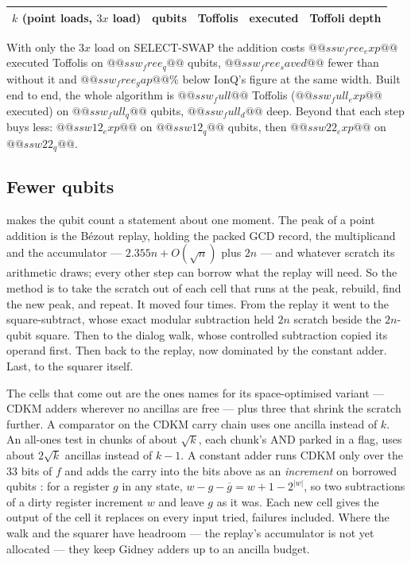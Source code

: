 \begin{center}\small
\begin{tabular}{lrrrr}
\toprule
$k$ (point loads, $3x$ load) & qubits & Toffolis & executed & Toffoli depth\\
\midrule
\bottomrule
\end{tabular}
\end{center}

With only the $3x$ load on SELECT-SWAP the addition costs $@@ssw_free_exp@@$ executed Toffolis on
$@@ssw_free_q@@$ qubits, $@@ssw_free_saved@@$ fewer than without it and $@@ssw_free_gap@@\%$ below IonQ's
figure at the same width. Built end to end, the whole algorithm is $@@ssw_full@@$ Toffolis
($@@ssw_full_exp@@$ executed) on $@@ssw_full_q@@$ qubits, $@@ssw_full_d@@$ deep. Beyond that each
step buys less: $@@ssw12_exp@@$ on $@@ssw12_q@@$ qubits, then $@@ssw22_exp@@$ on $@@ssw22_q@@$.

\subsection{Fewer qubits}\label{ec:sec:fewq}

\cite{ec:schrott26} makes the qubit count a statement about one moment. The peak of a point
addition is the B\'ezout replay, holding the packed GCD record, the multiplicand and the
accumulator --- $2.355n+O(\sqrt n)$ plus $2n$ --- and whatever scratch its arithmetic draws; every
other step can borrow what the replay will need. So the method is to take the scratch out of each
cell that runs at the peak, rebuild, find the new peak, and repeat. It moved four times. From the
replay it went to the square-subtract, whose exact modular subtraction held $2n$ scratch beside the
$2n$-qubit square. Then to the dialog walk, whose controlled subtraction copied its operand first.
Then back to the replay, now dominated by the constant adder. Last, to the squarer itself.

The cells that come out are the ones \cite{ec:schrott26} names for its space-optimised variant ---
CDKM adders wherever no ancillas are free --- plus three that shrink the scratch further. A
comparator on the CDKM carry chain uses one ancilla instead of $k$. An all-ones test in chunks of
about $\sqrt k$, each chunk's AND parked in a flag, uses about $2\sqrt k$ ancillas instead of $k-1$.
A constant adder runs CDKM only over the $33$ bits of $f$ and adds the carry into the bits above as an
\emph{increment} on borrowed qubits \cite{ec:gidney15}: for a register $g$ in any state,
$w-g-\overline g=w+1-2^{|w|}$, so two subtractions of a dirty register increment $w$ and leave $g$
as it was. Each new cell gives the output of the cell it replaces on every input tried, failures
included. Where the walk and the squarer have headroom --- the replay's accumulator is not yet
allocated --- they keep Gidney adders up to an ancilla budget.


